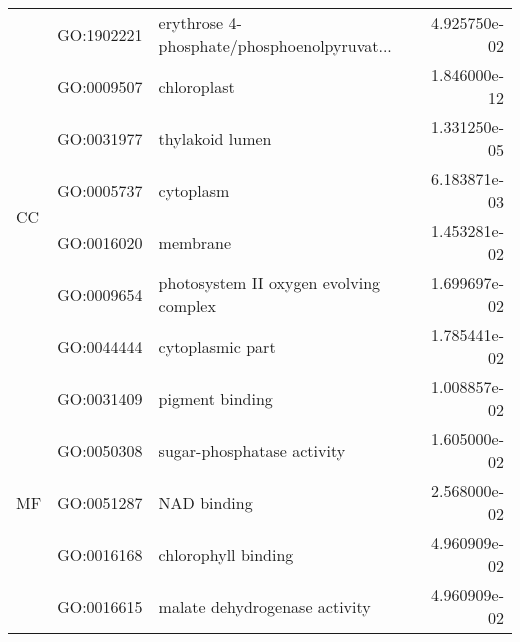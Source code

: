\begin{longtable}{lllr}
   & GO:1902221 &  erythrose 4-phosphate/phosphoenolpyruvat... &  4.925750e-02 \\
\cline{1-4}
\multirow{6}{*}{CC} & GO:0009507 &                                  chloroplast &  1.846000e-12 \\
   & GO:0031977 &                              thylakoid lumen &  1.331250e-05 \\
   & GO:0005737 &                                    cytoplasm &  6.183871e-03 \\
   & GO:0016020 &                                     membrane &  1.453281e-02 \\
   & GO:0009654 &       photosystem II oxygen evolving complex &  1.699697e-02 \\
   & GO:0044444 &                             cytoplasmic part &  1.785441e-02 \\
\cline{1-4}
\multirow{5}{*}{MF} & GO:0031409 &                              pigment binding &  1.008857e-02 \\
   & GO:0050308 &                   sugar-phosphatase activity &  1.605000e-02 \\
   & GO:0051287 &                                  NAD binding &  2.568000e-02 \\
   & GO:0016168 &                          chlorophyll binding &  4.960909e-02 \\
   & GO:0016615 &                malate dehydrogenase activity &  4.960909e-02 \\
\end{longtable}
